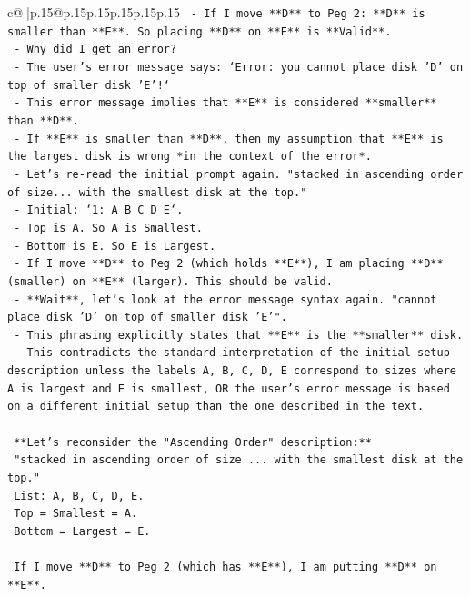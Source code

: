 \documentclass{article}
\begin{document}
{\begin{supertabular}{c@{$\;$}|p{.15\linewidth}@{}p{.15\linewidth}p{.15\linewidth}p{.15\linewidth}p{.15\linewidth}p{.15\linewidth}}
{{{\texttt{    {-} If I move **D** to Peg 2: **D** is smaller than **E**. So placing **D** on **E** is **Valid**.} \\
\texttt{    {-} Why did I get an error?} \\
\texttt{        {-} The user's error message says: `Error: you cannot place disk 'D' on top of smaller disk 'E'!`} \\
\texttt{        {-} This error message implies that **E** is considered **smaller** than **D**.} \\
\texttt{        {-} If **E** is smaller than **D**, then my assumption that **E** is the largest disk is wrong *in the context of the error*.} \\
\texttt{        {-} Let's re{-}read the initial prompt again. "stacked in ascending order of size... with the smallest disk at the top."} \\
\texttt{        {-} Initial: `1: A B C D E`.} \\
\texttt{        {-} Top is A. So A is Smallest.} \\
\texttt{        {-} Bottom is E. So E is Largest.} \\
\texttt{        {-} If I move **D** to Peg 2 (which holds **E**), I am placing **D** (smaller) on **E** (larger). This should be valid.} \\
\texttt{        {-} **Wait**, let's look at the error message syntax again. "cannot place disk 'D' on top of smaller disk 'E'".} \\
\texttt{        {-} This phrasing explicitly states that **E** is the **smaller** disk.} \\
\texttt{        {-} This contradicts the standard interpretation of the initial setup description unless the labels A, B, C, D, E correspond to sizes where A is largest and E is smallest, OR the user's error message is based on a different initial setup than the one described in the text.} \\
\\ 
\texttt{        **Let's reconsider the "Ascending Order" description:**} \\
\texttt{        "stacked in ascending order of size ... with the smallest disk at the top."} \\
\texttt{        List: A, B, C, D, E.} \\
\texttt{        Top = Smallest = A.} \\
\texttt{        Bottom = Largest = E.} \\
\\ 
\texttt{        If I move **D** to Peg 2 (which has **E**), I am putting **D** on **E**.} \\
}}}
\end{supertabular}}
\end{document}
